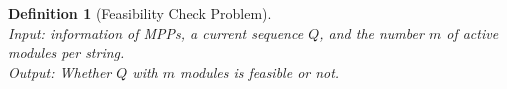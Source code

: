\documentclass[conference]{IEEEtran}
\newtheorem{definition}{Definition}
\begin{document}
\begin{definition}[Feasibility Check Problem]\\
Input: information of MPPs, a current sequence $Q$, and the number $m$ of active modules per string.\\
Output: Whether $Q$ with $m$ modules is feasible or not.
\end{definition}


%

\end{document}
